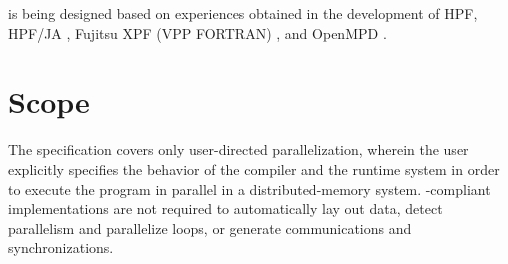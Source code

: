 \begin{itemize}
%
%
%
%
%

\end{itemize}

{\XMP} is being designed based on experiences obtained in the
development of HPF, HPF/JA \cite{hpfja}, Fujitsu XPF (VPP
FORTRAN) \cite{XPF,VPPFORTRAN}, and OpenMPD \cite{OpenMPD}.

\section{Scope}

The {\XMP} specification covers only user-directed parallelization,
wherein the user explicitly specifies the behavior of the compiler and
the runtime system in order to execute the program in parallel in a
distributed-memory system.
%
{\XMP}-compliant implementations are not required to automatically
lay out data, detect parallelism and parallelize loops, or generate
communications and synchronizations.

%

